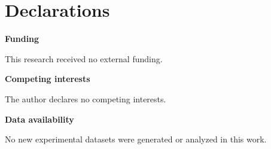 \section*{Declarations}
\textbf{Funding}

This research received no external funding.

\textbf{Competing interests}

The author declares no competing interests.

\textbf{Data availability}

No new experimental datasets were generated or analyzed in this work.

